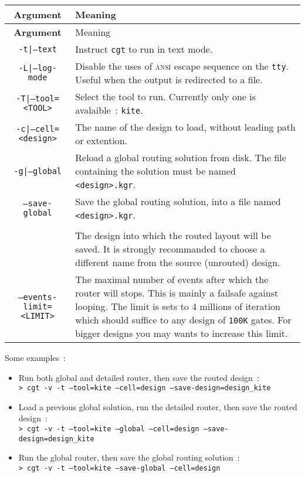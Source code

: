 \documentclass[11pt]{article}
\newcommand {\ANSI}               {\textsc{ansi}\xspace}
\newcommand {\tty}                {\texttt{tty}\xspace}
\newcommand {\cgt}                {\texttt{cgt}\xspace}
\begin{document}
  \begin{center}
  \begin{longtable}{|c|p{}|}
      \hline
      \textbf{Argument} & Meaning \\
      \hline
      \hline
    \endfirsthead
      \hline
      \textbf{Argument} & Meaning \\
      \hline
      \hline
    \endhead
      \hline
    \endfoot
    \endlastfoot
    \hline
    \texttt{-t|--text}
      & Instruct \cgt to run in text mode. \\
    \hline
    \texttt{-L|--log-mode}
      & Disable the uses of \ANSI escape sequence on the \tty. Useful when
        the output is redirected to a file. \\
    \hline
    \texttt{-T|--tool=<TOOL>}
      & Select the tool to run. Currently only one is avalaible~:
        \texttt{kite}. \\
    \hline
    \texttt{-c|--cell=<design>}
      & The name of the design to load, without leading path or
        extention. \\
    \hline
    \texttt{-g|--global}
      & Reload a global routing solution from disk. \linebreak
        The file containing the solution must be named \texttt{<design>.kgr}. \\
    \hline
    \texttt{--save-global}
      & Save the global routing solution, into a file named \texttt{<design>.kgr}. \\
    \hline
    \newpage
    \multicolumn{2}{|l|}{\texttt{-s|--save-design=<routed\_design>}} \\
    \cline{1-1}
      & The design into which the routed layout will be saved. It is strongly
        recommanded to choose a different name from the source (unrouted)
        design. \\
    \hline
    \texttt{--events-limit=<LIMIT>}
      & The maximal number of events after which the router will stops. This is
        mainly a failsafe against looping. The limit is sets to 4 millions of
        iteration which should suffice to any design of \texttt{100K}\xspace
        gates. For bigger designs you may wants to increase this limit. \\
    \hline
  \end{longtable}
  \end{center}

  \noindent
  Some examples~:
  \begin{itemize}
    \item Run both global and detailed router, then save the routed design~: \\
          \texttt{> cgt -v -t --tool=kite --cell=design --save-design=design\_kite}
    \item Load a previous global solution, run the detailed router, then save the
          routed design~: \\
          \texttt{> cgt -v -t --tool=kite --global --cell=design --save-design=design\_kite}
    \item Run the global router, then save the global routing solution~: \\
          \texttt{> cgt -v -t --tool=kite --save-global --cell=design}
  \end{itemize}


 
\end{document}
